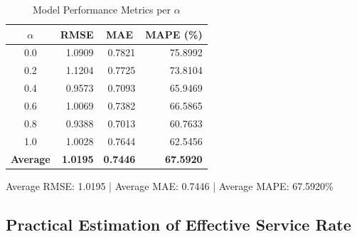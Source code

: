 \documentclass[12pt]{article}
\begin{document}
\begin{table}[htbp]
  \centering
  \caption{Model Performance Metrics per $\alpha$}
  \label{tab:naive_model_metrics}

  \renewcommand{\arraystretch}{1.2}

  \begin{tabular}{c r r r}
    \toprule
    $\alpha$         & \multicolumn{1}{c}{RMSE} & \multicolumn{1}{c}{MAE} & \multicolumn{1}{c}{MAPE (\%)} \\
    \midrule
    0.0              & 1.0909                   & 0.7821                  & 75.8992                       \\
    0.2              & 1.1204                   & 0.7725                  & 73.8104                       \\
    0.4              & 0.9573                   & 0.7093                  & 65.9469                       \\
    0.6              & 1.0069                   & 0.7382                  & 66.5865                       \\
    0.8              & 0.9388                   & 0.7013                  & 60.7633                       \\
    1.0              & 1.0028                   & 0.7644                  & 62.5456                       \\
    \midrule
    \textbf{Average} & \textbf{1.0195}          & \textbf{0.7446}         & \textbf{67.5920}              \\
    \bottomrule
  \end{tabular}

  \vspace{0.5em}

  \noindent\footnotesize Average RMSE: 1.0195 \quad | \quad Average MAE: 0.7446 \quad | \quad Average MAPE: 67.5920\%
\end{table}

\subsection{Practical Estimation of Effective Service Rate}

\end{document}
